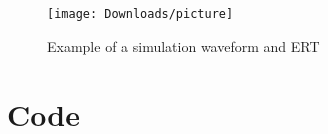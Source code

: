 \documentclass[11pt]{article}
\newcommand{\Verilog}[2][]{%
	
}
\begin{document}
\begin{figure}[th]
	\centering
	\texttt{[image: Downloads/picture]}
	\caption{Example of a simulation waveform and ERT}
	\label{fig:picture}
\end{figure}


\section*{Code}

\Verilog[caption=File-included Verilog code example,label=code:file_ex]{Downloads/lab1_example_code.sv}
\end{document}

